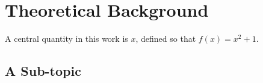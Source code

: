 \section{Theoretical Background}
\label{sec:background}

A central quantity in this work is $x$, defined so that $f(x) = x^2 + 1$.
\lipsum[4]

\subsection{A Sub-topic}
\label{subsec:subtopic}

\lipsum[5]
